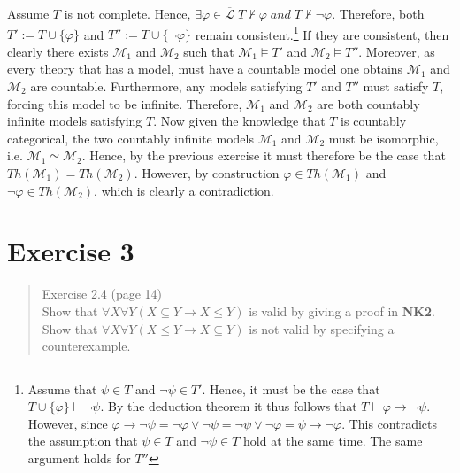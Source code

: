 \documentclass[11pt,a4paper]{article}
\newcommand{\sand}{\; and \;}
\newcommand{\derives}{\vdash}
\newcommand{\nderives}{\nvdash}
\begin{document}
Assume $T$ is not complete. Hence, $\exists \varphi \in \overline{\mathcal{L}}\; T\nderives \varphi \sand T \nderives \neg \varphi$. Therefore, both $T':=T \cup \{\varphi\}$ and $T'':=T \cup \{\neg \varphi\}$ remain consistent.\footnote{Assume that $\psi \in T$ and $\neg \psi \in T'$. Hence, it must be the case that $T \cup \{\varphi\}\derives \neg \psi$. By the deduction theorem it thus follows that $T \derives \varphi \to \neg \psi$. However, since $\varphi \to \neg \psi = \neg \varphi \lor \neg \psi = \neg \psi \lor \neg \varphi  = \psi \to \neg \varphi$. This contradicts the assumption that $\psi \in T$ and $\neg \psi \in T$ hold at the same time. The same argument holds for $T''$
} 
If they are consistent, then clearly there exists $\mathcal{M}_1$ and $\mathcal{M}_2$ such that $\mathcal{M}_1 \models T'$ and $\mathcal{M}_2 \models T''$. Moreover, as every theory that has a model, must have a countable model one obtains $\mathcal{M}_1$ and $\mathcal{M}_2$ are countable. Furthermore, any models satisfying $T'$ and $T''$ must satisfy $T$, forcing this model to be infinite. Therefore, $\mathcal{M}_1$ and $\mathcal{M}_2$ are both countably infinite models satisfying $T$. Now given the knowledge that $T$ is countably categorical, the two countably infinite models $\mathcal{M}_1$ and $\mathcal{M}_2$ must be isomorphic, i.e. $\mathcal{M}_1 \simeq \mathcal{M}_2$. Hence, by the previous exercise it must therefore be the case that $Th(\mathcal{M}_1)= Th(\mathcal{M}_2)$. However, by construction $\varphi \in Th(\mathcal{M}_1)$ and $\neg \varphi \in Th(\mathcal{M}_2)$, which is clearly a contradiction.

\section*{Exercise 3}
\begin{quote}
Exercise 2.4 (page 14) \\
Show that $\forall X \forall Y (X\subseteq Y \to X \leq Y) $ is valid by giving a proof in \textbf{NK2}. Show that  $\forall X \forall Y ( X \leq Y  \to X\subseteq Y) $ is not valid by specifying a counterexample.
\end{quote}
\end{document}
